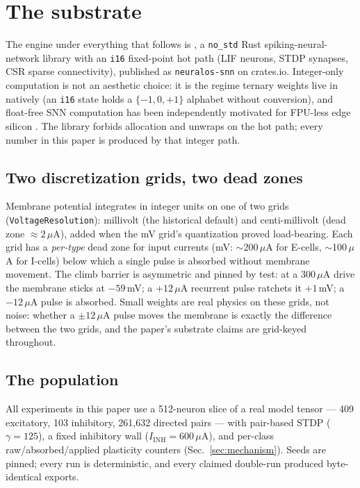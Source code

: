 \section{The substrate}
\label{sec:substrate}

The engine under everything that follows is \system{}, a
\texttt{no\_std} Rust spiking-neural-network library with an
\texttt{i16} fixed-point hot path (LIF neurons, STDP synapses, CSR
sparse connectivity), published as \texttt{neuralos-snn} on
crates.io. Integer-only computation is not an aesthetic choice: it is
the regime ternary weights live in natively (an \texttt{i16} state
holds a $\{-1,0,+1\}$ alphabet without conversion), and float-free SNN
computation has been independently motivated for FPU-less edge silicon
\citep{deshpande2025fullinteger}. The
library forbids allocation and unwraps on the hot path; every number
in this paper is produced by that integer path.

\subsection{Two discretization grids, two dead zones}
\label{sec:grids}

Membrane potential integrates in integer units on one of two grids
(\texttt{VoltageResolution}): millivolt (the historical default) and
centi-millivolt (dead zone $\approx 2\,\mu$A), added when the mV
grid's quantization proved load-bearing. Each grid has a
\emph{per-type} dead zone for input currents (mV: $\sim$200\,$\mu$A
for E-cells, $\sim$100\,$\mu$A for I-cells) below which a single
pulse is absorbed without membrane movement. The climb barrier is
asymmetric and pinned by test: at a 300\,$\mu$A drive the membrane
sticks at $-59$\,mV; a $+12\,\mu$A recurrent pulse ratchets it
$+1$\,mV; a $-12\,\mu$A pulse is absorbed. Small weights are real
physics on these grids, not noise: whether a $\pm 12\,\mu$A pulse
moves the membrane is exactly the difference between the two grids,
and the paper's substrate claims are grid-keyed throughout.

\subsection{The population}
\label{sec:population}

All experiments in this paper use a 512-neuron slice of a real model
tensor --- 409 excitatory, 103 inhibitory, 261{,}632 directed pairs
--- with pair-based STDP ($\gamma = 125$), a fixed inhibitory wall
($I_{\mathrm{INH}} = 600\,\mu$A), and per-class raw/absorbed/applied
plasticity counters (Sec.~\ref{sec:mechanism}). Seeds are pinned;
every run is deterministic, and every claimed double-run produced
byte-identical exports.

